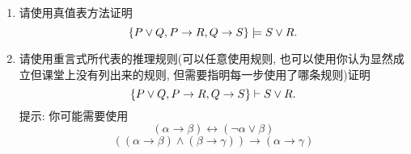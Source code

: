 \documentclass[a4paper, justified]{tufte-handout}
\begin{document}
\begin{problem}[重言蕴含与推理规则 \score{5 = 3 + 2 ($\star\star\star$)}]
  \begin{enumerate}[(1)]
    \item 请使用真值表方法证明
      \[
        \{P \lor Q, P \to R, Q \to S\} \models S \lor R.
      \]
    \item 请使用重言式所代表的推理规则(可以任意使用规则,
      也可以使用你认为显然成立但课堂上没有列出来的规则, 但需要指明每一步使用了哪条规则)证明
      \[
        \{P \lor Q, P \to R, Q \to S\} \vdash S \lor R.
      \]
      提示: 你可能需要使用
      \[
        (\alpha \to \beta) \leftrightarrow (\lnot \alpha \lor \beta)
      \]
      \[
        ((\alpha \to \beta) \land (\beta \to \gamma)) \to (\alpha \to \gamma)
      \]
  \end{enumerate}
\end{problem}
\end{document}
